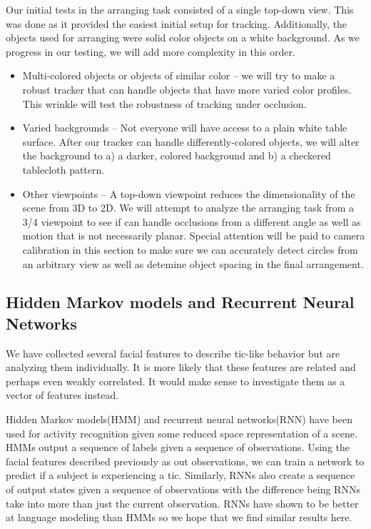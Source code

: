 \documentclass[11pt]{article}
\begin{document}
Our initial tests in the arranging task consisted of a single top-down view. This was done as it provided the easiest initial setup for tracking. Additionally, the objects used for arranging were solid color objects on a white background. As we progress in our testing, we will add more complexity in this order.
\begin{itemize}
	\item{Multi-colored objects or objects of similar color -- we will try to make a robust tracker that can handle objects that have more varied color profiles. This wrinkle will test the robustness of tracking under occlusion.}
	\item{Varied backgrounds -- Not everyone will have access to a plain white table surface. After our tracker can handle differently-colored objects, we will alter the background to a) a darker, colored background and b) a checkered tablecloth pattern.}
	\item{Other viewpoints -- A top-down viewpoint reduces the dimensionality of the scene from 3D to 2D. We will attempt to analyze the arranging task from a 3/4 viewpoint to see if can handle occlusions from a different angle as well as motion that is not necessarily planar. Special attention will be paid to camera calibration in this section to make sure we can accurately detect circles from an arbitrary view as well as detemine object spacing in the final arrangement.}
\end{itemize}
\subsection{Hidden Markov models and Recurrent Neural Networks}
We have collected several facial features to  describe tic-like behavior but are analyzing them individually. It is more likely that these features are related and perhaps even weakly correlated. It would make sense to investigate them as a vector of features instead.

Hidden Markov models(HMM) and recurrent neural networks(RNN) have been used for activity recognition given some reduced space representation of a scene. HMMs output a sequence of labels given a sequence of observations. Using the facial features described previously as out observations, we can train a network to predict if a subject is experiencing a tic. Similarly, RNNs also create a sequence of output states given a sequence of observations with the difference being RNNs take into more than just the current observation. RNNs have shown to be better at language modeling than HMMs so we hope that we find similar results here.
\end{document}

